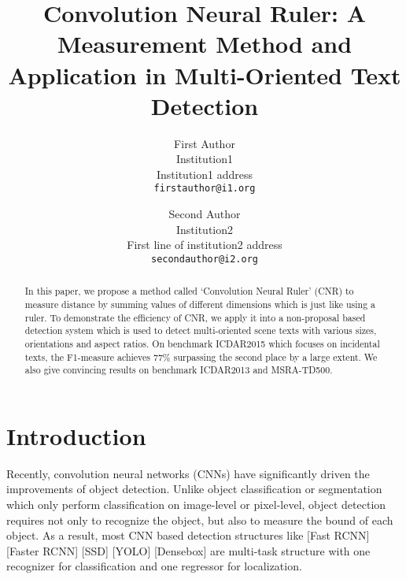 \documentclass[10pt,twocolumn,letterpaper]{article}
\begin{document}
\title{Convolution Neural Ruler: A Measurement Method and Application in Multi-Oriented Text Detection}

\author{First Author\\
Institution1\\
Institution1 address\\
{\tt\small firstauthor@i1.org}
\and
Second Author\\
Institution2\\
First line of institution2 address\\
{\tt\small secondauthor@i2.org}
}

\maketitle

\begin{abstract}
   In this paper, we propose a method called ‘Convolution Neural Ruler’ (CNR) to measure distance by summing values of different dimensions which is just like using a ruler. To demonstrate the efficiency of CNR, we apply it into a non-proposal based detection system which is used to detect multi-oriented scene texts with various sizes, orientations and aspect ratios. On benchmark ICDAR2015 which focuses on incidental texts, the F1-measure achieves 77\% surpassing the second place by a large extent. We also give convincing results on benchmark ICDAR2013 and MSRA-TD500.
\end{abstract}

\section{Introduction}

Recently, convolution neural networks (CNNs) have significantly driven the improvements of object detection. Unlike object classification or segmentation which only perform classification on image-level or pixel-level, object detection requires not only to recognize the object, but also to measure the bound of each object. As a result, most CNN based detection structures like [Fast RCNN] [Faster RCNN] [SSD] [YOLO] [Densebox] are multi-task structure with one recognizer for classification and one regressor for localization.
\end{document}

